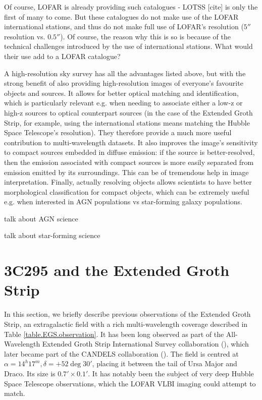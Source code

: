 \pg
Of course, LOFAR is already providing such catalogues - LOTSS [cite] is only the first of many to come. But these catalogues do not make use of the LOFAR international stations, and thus do not make full use of LOFAR's resolution ($5''$ resolution vs. $0.5''$). Of course, the reason why this is so is because of the technical challenges introduced by the use of international stations. What would their use add to a LOFAR catalogue?

\pg
A high-resolution sky survey has all the advantages listed above, but with the strong benefit of also providing high-resolution images of everyone's favourite objects and sources. It allows for better optical matching and identification, which is particularly relevant e.g. when needing to associate either a low-z or high-z sources to optical counterpart sources (in the case of the Extended Groth Strip, for example, using the international stations means matching the Hubble Space Telescope's resolution). They therefore provide a much more useful contribution to multi-wavelength datasets. It also improves the image's sensitivity to compact sources embedded in diffuse emission: if the source is better-resolved, then the emission associated with compact sources is more easily separated from emission emitted by its surroundings. This can be of tremendous help in image interpretation. Finally, actually resolving objects allows scientists to have better morphological classification for compact objects, which can be extremely useful e.g. when interested in AGN populations vs star-forming galaxy populations.

\pg
talk about AGN science

\pg
talk about star-forming science



\section{3C295 and the Extended Groth Strip}

\pg
In this section, we briefly describe previous observations of the Extended Groth Strip, an extragalactic field with a rich multi-wavelength coverage described in Table \ref{table.EGS.observation}. It has been long observed as part of the All-Wavelength Extended Groth Strip International Survey collaboration (), which later became part of the CANDELS collaboration (). The field is centred at $\alpha=14^h17^m,\delta=+52\deg 30'$, placing it between the tail of Ursa Major and Draco. Its size is $0.7'\times 0.1'$. It has notably been the subject of very deep Hubble Space Telescope observations, which the LOFAR VLBI imaging could attempt to match. 

